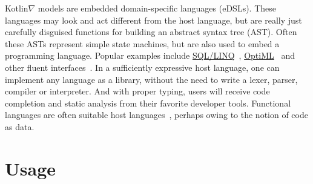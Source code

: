 \documentclass[12pt,initial,twoside,maitrise]{dms}
\numberwithin{equation}{section}
\numberwithin{table}{chapter}
\numberwithin{figure}{chapter}
\begin{document}
Kotlin$\nabla$ models are embedded domain-specific languages (eDSLs). These languages may look and act different from the host language, but are really just carefully disguised functions for building an abstract syntax tree (AST). Often these ASTs represent simple state machines, but are also used to embed a programming language. Popular examples include \href{https://docs.microsoft.com/en-us/dotnet/framework/data/adonet/sql/linq/}{SQL/LINQ}~\citep{meijer2006linq}, \href{http://stanford-ppl.github.io/Delite/optiml/}{OptiML}~\citep{sujeeth2011optiml} and other fluent interfaces~\citep{fowler05fluent}. In a sufficiently expressive host language, one can implement any language as a library, without the need to write a lexer, parser, compiler or interpreter. And with proper typing, users will receive code completion and static analysis from their favorite developer tools. Functional languages are often suitable host languages~\citep{elliott2003compiling,rompf2010lightweight}, perhaps owing to the notion of code as data.

\section{Usage}
\end{document}
